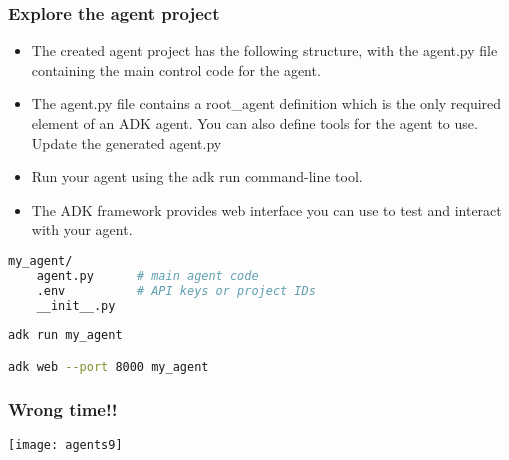		
\begin{frame}[fragile]\frametitle{Explore the agent project}
      \begin{itemize}
	\item The created agent project has the following structure, with the agent.py file containing the main control code for the agent.
		\item The agent.py file contains a root\_agent definition which is the only required element of an ADK agent. You can also define tools for the agent to use. Update the generated agent.py 
		\item Run your agent using the adk run command-line tool.
		\item The ADK framework provides web interface you can use to test and interact with your agent.
	  \end{itemize}
      
      \begin{lstlisting}[language=bash]
my_agent/
    agent.py      # main agent code
    .env          # API keys or project IDs
    __init__.py
	
adk run my_agent	

adk web --port 8000 my_agent
      \end{lstlisting}
\end{frame}

\begin{frame}[fragile]\frametitle{Wrong time!!}


		\begin{center}
		\texttt{[image: agents9]}
		\end{center}	
\end{frame}

